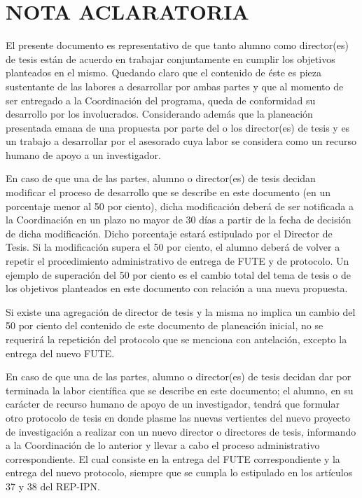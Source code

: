 \documentclass[runningheads,a4paper]{book}
\begin{document}
\section{NOTA ACLARATORIA}
El presente documento es representativo de que tanto alumno como director(es) de tesis están de acuerdo en trabajar conjuntamente en cumplir los objetivos planteados en el mismo. Quedando claro que el contenido de éste es pieza sustentante de las labores a desarrollar por ambas partes y que al momento de ser entregado a la Coordinación del programa, queda de conformidad su desarrollo por los involucrados. Considerando además que la planeación presentada emana de una propuesta por parte del o los director(es) de tesis y es un trabajo a desarrollar por el asesorado cuya labor se considera como un recurso humano de apoyo a un investigador.

En caso de que una de las partes, alumno o director(es) de tesis decidan modificar el proceso de desarrollo que se describe en este documento (en un porcentaje menor al 50 por ciento), dicha modificación deberá de ser notificada a la Coordinación en un plazo no mayor de 30 días a partir de la fecha de decisión de dicha modificación. Dicho porcentaje estará estipulado por el Director de Tesis. Si la modificación supera el 50 por ciento, el alumno deberá de volver a repetir el procedimiento administrativo de entrega de FUTE y de protocolo. Un ejemplo de superación del 50 por ciento es el cambio total del tema de tesis o de los objetivos planteados en este documento con relación a una nueva propuesta.

Si existe una agregación de director de tesis y la misma no implica un cambio del 50 por ciento del contenido de este documento de planeación inicial, no se requerirá la repetición del protocolo que se menciona con antelación, excepto la entrega del nuevo FUTE.

En caso de que una de las partes, alumno o director(es) de tesis decidan dar por terminada la labor científica que se describe en este documento; el alumno, en su carácter de recurso humano de apoyo de un investigador, tendrá que formular otro protocolo de tesis en donde plasme las nuevas vertientes del nuevo proyecto de investigación a realizar con un nuevo director o directores de tesis, informando a la Coordinación de lo anterior y llevar a cabo el proceso administrativo correspondiente. El cual consiste en la entrega del FUTE correspondiente y la entrega del nuevo protocolo, siempre que se cumpla lo estipulado en los artículos 37 y 38 del REP-IPN. 
\end{document}
